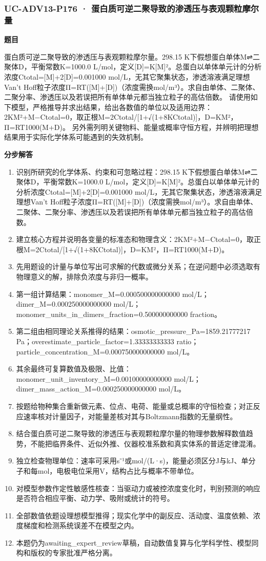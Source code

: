 \documentclass[UTF8,11pt,a4paper]{ctexart}
\begin{document}
\subsubsection*{UC-ADV13-P176 · 蛋白质可逆二聚导致的渗透压与表观颗粒摩尔量}
\noindent\textbf{题目}\par
蛋白质可逆二聚导致的渗透压与表观颗粒摩尔量。298.15 K下假想蛋白单体M⇌二聚体D，平衡常数K=1000.0 L/mol，定义[D]=K[M]²。总蛋白以单体单元计的分析浓度Ctotal=[M]+2[D]=0.001000 mol/L，无其它聚集状态，渗透溶液满足理想Van’t Hoff粒子浓度Π=RT([M]+[D])（浓度需换mol/m³）。求自由单体、二聚体、二聚分率、渗透压以及若误把所有单体单元都当独立粒子的高估倍数。 请使用如下模型，严格推导并求出结果，给出各数值的单位以及适用边界：2KM²+M−Ctotal=0，取正根M=2Ctotal/[1+√(1+8KCtotal)]，D=KM²，Π=RT1000(M+D)。 另外需列明关键物料、能量或概率守恒方程，并辨明把理想结果用于实际化学体系可能遇到的失效机制。\par
\medskip\noindent\textbf{分步解答}
\begin{enumerate}
\item 识别所研究的化学体系、约束和可忽略过程：298.15 K下假想蛋白单体M⇌二聚体D，平衡常数K=1000.0 L/mol，定义[D]=K[M]²。总蛋白以单体单元计的分析浓度Ctotal=[M]+2[D]=0.001000 mol/L，无其它聚集状态，渗透溶液满足理想Van’t Hoff粒子浓度Π=RT([M]+[D])（浓度需换mol/m³）。求自由单体、二聚体、二聚分率、渗透压以及若误把所有单体单元都当独立粒子的高估倍数。
\item 建立核心方程并说明各变量的标准态和物理含义：2KM²+M−Ctotal=0，取正根M=2Ctotal/[1+√(1+8KCtotal)]，D=KM²，Π=RT1000(M+D)。
\item 先用题设的计量与单位写出可求解的代数或微分关系；在逆问题中必须选取有物理意义的解，排除负浓度与非归一概率。
\item 第一组计算结果：monomer\_M=0.000500000000000 mol/L；dimer\_M=0.000250000000000 mol/L；monomer\_units\_in\_dimers\_fraction=0.500000000000 fraction。
\item 第二组由相同理论关系推得的结果：osmotic\_pressure\_Pa=1859.21777217 Pa；overestimate\_particle\_factor=1.33333333333 ratio；particle\_concentration\_M=0.000750000000000 mol/L。
\item 其余最终可复算数值及极限、比值：monomer\_unit\_inventory\_M=0.00100000000000 mol/L；dimer\_mass\_action\_M=0.000250000000000 mol/L。
\item 按题给物种集合重新做元素、位点、电荷、能量或总概率的守恒检查；对正反应速率核对计量因子，对能量差核对其与Boltzmann指数的无量纲性。
\item 结合蛋白质可逆二聚导致的渗透压与表观颗粒摩尔量的物理参数解释数值趋势，不能把临界条件、近似外推、仪器校准系数和真实体系的普适定律混淆。
\item 独立检查物理单位：速率可采用s⁻¹或mol/(L·s)，能量必须区分J与kJ、单分子和每mol，电极电位采用V，结构占比与概率不带单位。
\item 对模型参数作定性敏感性核查：当驱动力或被控浓度变化时，判别预测的响应是否符合相应平衡、动力学、吸附或统计的符号。
\item 全部数值依题设理想模型推得；现实化学中的副反应、活动度、温度依赖、浓度梯度和检测系统误差不在模型之内。
\item 本题仍为awaiting\_expert\_review草稿，自动数值复算与化学科学性、模型同构和版权的专家批准严格分离。
\end{enumerate}
\end{document}
